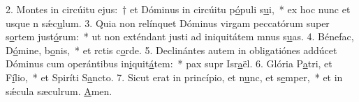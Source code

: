 2. Montes in circúitu ejus:~† et Dóminus in circúitu p\uline{ó}puli s\uline{u}i,~* ex hoc nunc et usque n sǽc\uline{u}lum.
3. Quia non relínquet Dóminus virgam peccatórum super s\uline{o}rtem just\uline{ó}rum:~* ut non exténdant justi ad iniquitátem mnus s\uline{u}as.
4. Bénefac, D\uline{ó}mine, b\uline{o}nis,~* et rctis c\uline{o}rde.
5. Declinántes autem in obligatiónes addúcet Dóminus cum operántibus in\uline{i}quit\uline{á}tem:~* pax supr Isr\uline{a}ël.
6. Glória P\uline{a}tri, et F\uline{í}lio,~* et Spiríti S\uline{a}ncto.
7. Sicut erat in princípio, et n\uline{u}nc, et s\uline{e}mper,~* et in sǽcula sæculrum. \uline{A}men.
